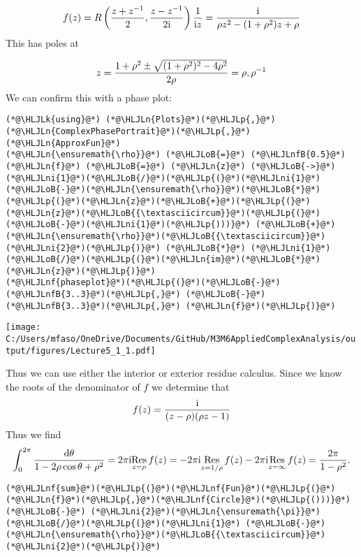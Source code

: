\documentclass[12pt,landscape]{article}
\newcommand{\HLJLk}[1]{\textcolor[RGB]{148,91,176}{\textbf{#1}}}
\newcommand{\HLJLn}[1]{#1}
\newcommand{\HLJLnf}[1]{\textcolor[RGB]{66,102,213}{#1}}
\newcommand{\HLJLnfB}[1]{\textcolor[RGB]{59,151,46}{#1}}
\newcommand{\HLJLni}[1]{\textcolor[RGB]{59,151,46}{#1}}
\newcommand{\HLJLoB}[1]{\textcolor[RGB]{102,102,102}{\textbf{#1}}}
\newcommand{\HLJLp}[1]{#1}
\def\D{ {\rm d} }
\def\I{ {\rm i} }
\def\Res_#1{\underset{#1}{\rm Res}\,}
\def\cent#1{\begin{center}#1\end{center} }
\begin{document}
{\[
f(z)= R\left({z + z^{-1} \over 2}, {z - z^{-1} \over 2 \I} \right) {1 \over \I z} =
{ \I \over \rho z^2 - (1+\rho^2) z + \rho}
\]
This has poles at

\[
z = {1 + \rho^2 \pm \sqrt{(1+\rho^2)^2 - 4 \rho^2 } \over 2\rho} = \rho, \rho^{-1}
\]
We can confirm this with a phase plot:


\begin{lstlisting}
(*@\HLJLk{using}@*) (*@\HLJLn{Plots}@*)(*@\HLJLp{,}@*) (*@\HLJLn{ComplexPhasePortrait}@*)(*@\HLJLp{,}@*) (*@\HLJLn{ApproxFun}@*)
(*@\HLJLn{\ensuremath{\rho}}@*) (*@\HLJLoB{=}@*) (*@\HLJLnfB{0.5}@*)
(*@\HLJLn{f}@*) (*@\HLJLoB{=}@*) (*@\HLJLn{z}@*) (*@\HLJLoB{->}@*)  (*@\HLJLni{1}@*)(*@\HLJLoB{/}@*)(*@\HLJLp{(}@*)(*@\HLJLni{1}@*)(*@\HLJLoB{-}@*)(*@\HLJLn{\ensuremath{\rho}}@*)(*@\HLJLoB{*}@*)(*@\HLJLp{(}@*)(*@\HLJLn{z}@*)(*@\HLJLoB{+}@*)(*@\HLJLp{(}@*)(*@\HLJLn{z}@*)(*@\HLJLoB{{\textasciicircum}}@*)(*@\HLJLp{(}@*)(*@\HLJLoB{-}@*)(*@\HLJLni{1}@*)(*@\HLJLp{)))}@*) (*@\HLJLoB{+}@*) (*@\HLJLn{\ensuremath{\rho}}@*)(*@\HLJLoB{{\textasciicircum}}@*)(*@\HLJLni{2}@*)(*@\HLJLp{)}@*) (*@\HLJLoB{*}@*) (*@\HLJLni{1}@*)(*@\HLJLoB{/}@*)(*@\HLJLp{(}@*)(*@\HLJLn{im}@*)(*@\HLJLoB{*}@*)(*@\HLJLn{z}@*)(*@\HLJLp{)}@*)
(*@\HLJLnf{phaseplot}@*)(*@\HLJLp{(}@*)(*@\HLJLoB{-}@*)(*@\HLJLnfB{3..3}@*)(*@\HLJLp{,}@*) (*@\HLJLoB{-}@*)(*@\HLJLnfB{3..3}@*)(*@\HLJLp{,}@*) (*@\HLJLn{f}@*)(*@\HLJLp{)}@*)
\end{lstlisting}

\cent{\texttt{[image: C:/Users/mfaso/OneDrive/Documents/GitHub/M3M6AppliedComplexAnalysis/output/figures/Lecture5\_1\_1.pdf]}}

Thus we can use either the interior or exterior residue calculus.  Since we know the roots of the denominator of $f$ we determine that
\[
f(z) = {\I \over (z - \rho) (\rho z - 1)}
\]
Thus we find
\[
\int_0^{2\pi} {\D \theta \over 1 - 2\rho \cos \theta + \rho^2} = 2 \pi \I \Res_{z = \rho} f(z) =
-2 \pi \I \Res_{z = 1/\rho} f(z) -2 \pi \I \Res_{z = \infty} f(z) = {2 \pi \over 1 - \rho^2}.
\]

\begin{lstlisting}
(*@\HLJLnf{sum}@*)(*@\HLJLp{(}@*)(*@\HLJLnf{Fun}@*)(*@\HLJLp{(}@*)(*@\HLJLn{f}@*)(*@\HLJLp{,}@*)(*@\HLJLnf{Circle}@*)(*@\HLJLp{()))}@*) (*@\HLJLoB{-}@*) (*@\HLJLni{2}@*)(*@\HLJLn{\ensuremath{\pi}}@*)(*@\HLJLoB{/}@*)(*@\HLJLp{(}@*)(*@\HLJLni{1}@*) (*@\HLJLoB{-}@*) (*@\HLJLn{\ensuremath{\rho}}@*)(*@\HLJLoB{{\textasciicircum}}@*)(*@\HLJLni{2}@*)(*@\HLJLp{)}@*)
\end{lstlisting}

}
\end{document}
